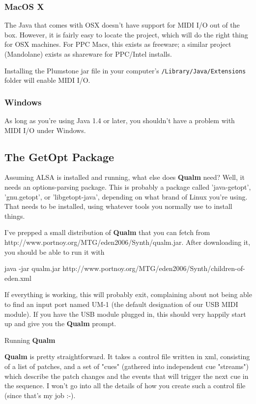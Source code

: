 \documentclass{article}
\newcommand{\q}{{\sf\bf{Qualm}}\xspace}
\newcommand{\code}[1]{{\tt #1}}
\begin{document}
\subsubsection{MacOS X}

The Java that comes with OSX doesn't have support for MIDI I/O out of
the box.  However, it is fairly easy to locate the
 project, which will
do the right thing for OSX machines.  For PPC Macs, this exists as
freeware; a similar project (Mandolane) exists as shareware for
PPC/Intel installs.

Installing the Plumstone jar file in your computer's
\code{/Library/Java/Extensions} folder will enable MIDI I/O.

\subsubsection{Windows}

As long as you're using Java 1.4 or later, you shouldn't have a
problem with MIDI I/O under Windows.

\subsection{The GetOpt Package}

Assuming ALSA is installed and running, what else does \q need?  Well,
it needs an options-parsing package.  This is probably a package
called 'java-getopt', 'gnu.getopt', or 'libgetopt-java', depending on
what brand of Linux you're using.  That needs to be installed, using
whatever tools you normally use to install things.

I've prepped a small distribution of \q that you can fetch from
http://www.portnoy.org/MTG/eden2006/Synth/qualm.jar.  After downloading
it, you should be able to run it with

    java -jar qualm.jar
    http://www.portnoy.org/MTG/eden2006/Synth/children-of-eden.xml

If everything is working, this will probably exit, complaining about not
being able to find an input port named UM-1 (the default designation of
our USB MIDI module).  If you have the USB module plugged in, this
should very happily start up and give you the \q prompt.

Running \q

\q is pretty straightforward.  It takes a control file written in
xml, consisting of a list of patches, and a set of "cues" (gathered into
independent cue "streams") which describe the patch changes and the
events that will trigger the next cue in the sequence.  I won't go into
all the details of how you create such a control file (since that's my
job :-).
\end{document}
